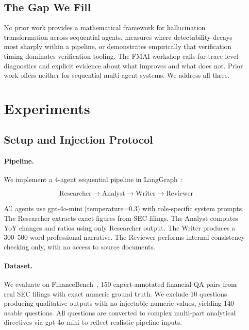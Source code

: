 \documentclass{article}
\theoremstyle{plain}
\theoremstyle{definition}
\theoremstyle{remark}
\begin{document}
\subsection{The Gap We Fill}
No prior work provides a mathematical framework for hallucination transformation across sequential agents, measures where detectability decays most sharply within a pipeline, or demonstrates empirically that verification timing dominates verification tooling. The FMAI workshop calls for trace-level diagnostics and explicit evidence about what improves and what does not. Prior work offers neither for sequential multi-agent systems. We address all three.

\section{Experiments}

\subsection{Setup and Injection Protocol}

\paragraph{Pipeline.} We implement a 4-agent sequential pipeline in LangGraph~\cite{langgraph}: 

\[
\text{Researcher} \to \text{Analyst} \to \text{Writer} \to \text{Reviewer}
\]

All agents use gpt-4o-mini (temperature=0.3) with role-specific system prompts. The Researcher extracts exact figures from SEC filings. The Analyst computes YoY changes and ratios using only Researcher output. The Writer produces a 300--500 word professional narrative. The Reviewer performs internal consistency checking only, with no access to source documents.

\paragraph{Dataset.} We evaluate on FinanceBench~\cite{patronus2023financebench}, 150 expert-annotated financial QA pairs from real SEC filings with exact numeric ground truth. We exclude 10 questions producing qualitative outputs with no injectable numeric values, yielding 140 usable questions. All questions are converted to complex multi-part analytical directives via gpt-4o-mini to reflect realistic pipeline inputs.
\end{document}
